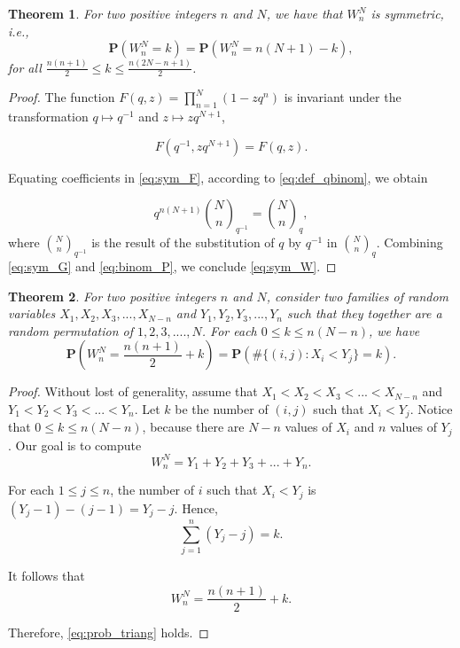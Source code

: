 \documentclass[12pt]{article} %
\newtheorem{theorem}{Theorem}
\theoremstyle{remark}
\begin{document}
\begin{theorem}
For two positive integers $n$ and $N$, we have that $W^N_n$ is symmetric, i.e.,
\begin{equation}
\label{eq:sym_W} \mathbf{P}\left( W^N_n = k \right) = \mathbf{P}\left( W^N_n = n\left(N+1\right) - k \right),
\end{equation}
for all $\frac{n(n+1)}{2} \leq k \leq \frac{n(2N-n+1)}{2}$.
\end{theorem}

\begin{proof}
The function $F(q,z) = \prod_{n=1}^N \left( 1 - z q^n\right)$ is invariant under the transformation $q\mapsto q^{-1}$ and $z\mapsto z q^{N+1}$,

\begin{equation} \label{eq:sym_F}
F\left(q^{-1}, z q^{N+1}\right) = F\left(q, z\right).
\end{equation}

Equating coefficients in \eqref{eq:sym_F}, according to \eqref{eq:def_qbinom}, we obtain

\begin{equation} \label{eq:sym_G}
q^{n(N+1)} \binom{N}{n}_{q^{-1}} = \binom{N}{n}_q,
\end{equation}
where $\binom{N}{n}_{q^{-1}}$ is the result of the substitution of $q$ by $q^{-1}$ in $\binom{N}{n}_q$. Combining \eqref{eq:sym_G} and \eqref{eq:binom_P}, we conclude \eqref{eq:sym_W}.
\end{proof}

\begin{theorem}
For two positive integers $n$ and $N$, consider two families of random variables $X_1, X_2, X_3, ..., X_{N-n}$ and $Y_1, Y_2, Y_3, ..., Y_n$ such that they together are a random permutation of $1, 2, 3, ...., N$. For each $0 \leq k \leq n(N-n)$, we have
\begin{equation}\label{eq:prob_triang}
\mathbf{P}\left( W^N_n = \frac{n(n+1)}{2} + k \right) = \mathbf{P}\left( \#\{(i,j): X_i < Y_j \} =  k \right).
\end{equation}
\end{theorem}

\begin{proof}
Without lost of generality, assume that $X_1 < X_2 < X_3 < ... < X_{N-n}$ and $Y_1 < Y_2 < Y_3 < ... < Y_n$. Let $k$ be the number of $(i, j)$ such that $X_i < Y_j$. Notice that $0 \leq k \leq n(N-n)$, because there are $N-n$ values of $X_i$ and $n$ values of $Y_j$. Our goal is to compute
\begin{equation}
W^N_n = Y_1 + Y_2 + Y_3 + ... + Y_n.
\end{equation}

For each $1 \leq j \leq n$, the number of $i$ such that $X_i < Y_j$ is $(Y_j - 1) - (j-1) = Y_j - j$. Hence,
\begin{equation}
\sum_{j=1}^n \left( Y_j - j \right) = k.
\end{equation}

It follows that
\begin{equation}
W^N_n = \frac{n(n+1)}{2} + k.
\end{equation}

Therefore, \eqref{eq:prob_triang} holds.
\end{proof}
\end{document}
